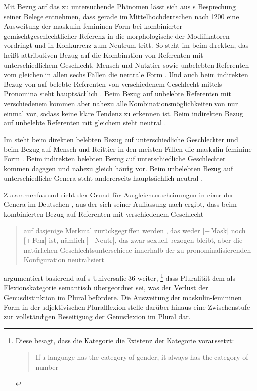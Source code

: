 Mit Bezug auf das zu untersuchende Phänomen lässt sich aus
\citeauthor{askedal1973}s Besprechung seiner Belege entnehmen, dass gerade im
Mittelhochdeutschen nach 1200 eine Ausweitung der
maskulin-femininen Form bei kombinierter gemischt\-geschlechtlicher Referenz in
die morphologische  der Modifikatoren vordringt und
in Konkurrenz zum Neutrum tritt. So steht im  beim direkten, das
heißt attributiven Bezug auf die Kombination von Referenten mit
unterschiedlichem Geschlecht, Mensch und Nutztier sowie
unbelebten Referenten vom gleichen  in allen sechs
Fällen die neutrale Form . Und auch beim indirekten Bezug von
 auf belebte Referenten von verschiedenem Geschlecht
mittels Pronomina steht hauptsächlich . Beim Bezug auf
unbelebte Referenten mit verschiedenem  kommen aber
nahezu alle Kombinationsmöglichkeiten von  nur
einmal vor, sodass keine klare Tendenz zu erkennen ist. Beim indirekten Bezug
auf unbelebte Referenten mit gleichem  steht neutral
 \autocites[145--148,
158--161]{askedal1973}[nach][]{lachmannhartl1952}.

Im  steht beim direkten belebten Bezug auf
unterschiedliche Geschlechter und beim Bezug auf Mensch und Reittier in den
meisten Fällen die maskulin-feminine Form . Beim indirekten
belebten Bezug auf unterschiedliche Geschlechter kommen dagegen
 und  nahezu gleich häufig vor. Beim
unbelebten Bezug auf unterschiedliche Genera steht
andererseits hauptsächlich neutral  \autocites[95--99,
126--128]{askedal1973}[nach][]{maroldschroeder1969}.

Zusammenfassend sieht \citeauthor{askedal1973} den Grund für
Ausgleichserscheinungen in einer 
der Genera im Deutschen
\autocite[241--247]{askedal1973}, aus der sich seiner Auffassung nach ergibt,
dass beim kombinierten Bezug auf Referenten mit verschiedenem Geschlecht
\blockcquote[253]{askedal1973}{auf dasjenige Merkmal zurückgegriffen werden
, das weder [+\,Mask] noch [+\,Fem] ist, nämlich [+\,Neutr], das
zwar sexuell bezogen bleibt, aber die natürlichen Geschlechts\-unterschiede
innerhalb der zu pronominalisierenden Konfiguration neutralisiert}.
\citet[173--177]{askedal1973} argumentiert basierend auf
\citeauthor{greenberg1966}s Universalie 36 weiter,%
%
	\footnote{Diese besagt, dass die Kategorie  die Existenz der
		Kategorie  voraussetzt:
		\foreignblockcquote{english}[112]{greenberg1966}{If a language has
		the category of gender, it always has the category of
		number}.%
	}
%
dass Pluralität dem  als Flexionskategorie semantisch übergeordnet
sei, was den Verlust der Genusdistinktion im Plural befördere. Die Ausweitung
der maskulin-femininen Form in der adjektivischen
Plural\-flexion stelle darüber hinaus eine
Zwischenstufe zur vollständigen Beseitigung der Genusflexion im Plural
dar.

